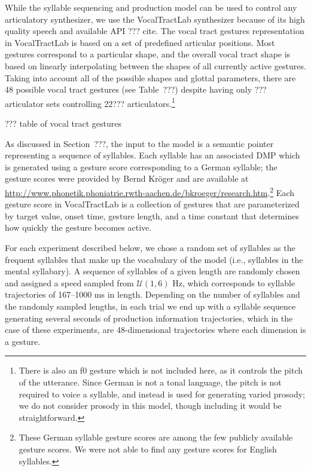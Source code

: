 While the syllable sequencing and production model
can be used to control any articulatory synthesizer,
we use the VocalTractLab synthesizer
because of its high quality speech
and available API ??? cite.
The vocal tract gestures representation
in VocalTractLab is based on a set of
predefined articular positions.
Most gestures correspond to
a particular shape,
and the overall vocal tract shape
is based on linearly interpolating
between the shapes of
all currently active gestures.
Taking into account all of the
possible shapes and glottal parameters,
there are 48 possible vocal tract gestures
(see Table~???) despite having only
??? articulator sets
controlling 22??? articulators.\footnote{
  There is also an f0 gesture which is not included here,
  as it controls the pitch of the utterance.
  Since German is not a tonal language,
  the pitch is not required to voice a syllable,
  and instead is used for generating
  varied prosody;
  we do not consider prosody in this model,
  though including it would be straightforward.}

??? table of vocal tract gestures

As discussed in Section~???,
the input to the model
is a semantic pointer
representing a sequence of syllables.
Each syllable has an associated DMP
which is generated using
a gesture score corresponding to
a German syllable;
the gesture scores were provided by
Bernd Kr\"{o}ger and are available at
\url{http://www.phonetik.phoniatrie.rwth-aachen.de/bkroeger/research.htm}.\footnote{
  These German syllable gesture scores are among
  the few publicly available gesture scores.
  We were not able to find any gesture scores
  for English syllables.}
Each gesture score in VocalTractLab
is a collection of
gestures that are parameterized by target value,
onset time, gesture length,
and a time constant that determines
how quickly the gesture becomes active.

For each experiment described below,
we chose a random set of syllables
as the frequent syllables
that make up the vocabulary
of the model
(i.e., syllables in the mental syllabary).
A sequence of syllables of a given length
are randomly chosen and assigned a speed
sampled from $\mathcal{U}(1, 6)$ Hz,
which corresponds to syllable trajectories of
167--1000 ms in length.
Depending on the number of syllables
and the randomly sampled lengths,
in each trial we end up with a syllable sequence
generating several seconds
of production information trajectories,
which in the case of these experiments,
are 48-dimensional trajectories
where each dimension is a gesture.

